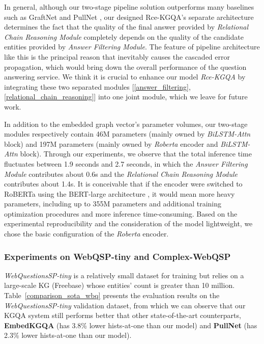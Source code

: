 \documentclass[pdflatex,sn-mathphys]{sn-jnl}%
\theoremstyle{thmstyleone}%
\theoremstyle{thmstyletwo}%
\theoremstyle{thmstylethree}%
\begin{document}

\textcolor[rgb]{1,0,0}{In general, although our two-stage pipeline solution outperforms many baselines such as GraftNet and PullNet \cite{sun2018graftnet,pullnet}, our designed Rce-KGQA's separate architecture determines the fact that the quality of the final answer provided by \textit{Relational Chain Reasoning Module} completely depends on the quality of the candidate entities provided by \textit{Answer Filtering Module}. The feature of pipeline architecture like this is the principal reason that inevitably causes the cascaded error propagation, which would bring down the overall performance of the question answering service. We think it is crucial to enhance our model \textit{Rce-KGQA} by integrating these two separated modules [\ref{answer_filtering}, \ref{relational_chain_reasoning}] into one joint module, which we leave for future work.} %

\textcolor[rgb]{1,0,0}{In addition to the embedded graph vector's parameter volumes, our two-stage modules respectively contain 46M parameters (mainly owned by \textit{BiLSTM-Attn} block) and 197M parameters (mainly owned by \textit{Roberta} encoder and \textit{BiLSTM-Attn} block). Through our experiments, we observe that the total inference time fluctuates between 1.9 seconds and 2.7 seconds, in which the \textit{Answer Filtering Module} contributes about 0.6s and the \textit{Relational Chain Reasoning Module} contributes about 1.4s. It is conceivable that if the encoder were switched to RoBERTa using the BERT-large architecture \cite{ott2019fairseq,roberta}, it would mean more heavy parameters, including up to 355M parameters and additional training optimization procedures and more inference time-consuming. Based on the experimental reproducibility and the consideration of the model lightweight, we chose the basic configuration of the \textit{Roberta} encoder.}

\subsubsection{Experiments on WebQSP-tiny and Complex-WebQSP} %
\textit{WebQuestionsSP-tiny} \cite{pmlrv162das22a,he2021stu-teaQA,apoorv2020embedKGQA} is a relatively small dataset for training but relies on a large-scale KG (Freebase) whose entities' count is greater than 10 million. Table~\ref{comparison_sota_wbq} presents the evaluation results on the \textit{WebQuestionsSP-tiny} validation dataset, from which we can observe that our KGQA system still performs better that other state-of-the-art counterparts, \textbf{EmbedKGQA} (has 3.8\% lower hists-at-one than our model) and \textbf{PullNet} (has 2.3\% lower hists-at-one than our model). 
\end{document}
